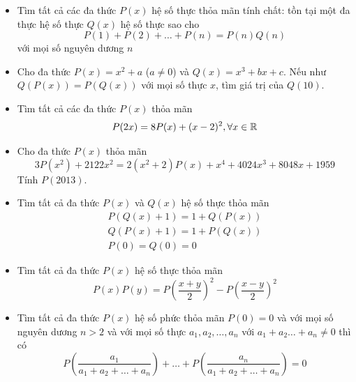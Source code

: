 \documentclass[11pt]{scrartcl}
\begin{document}
\begin{itemize}[label=, leftmargin=0em, itemsep=0.5em]
        \item \begin{btvn}
            Tìm tất cả các đa thức $P(x)$ hệ số thực thỏa mãn tính chất: tồn tại một đa thực hệ số thực $Q(x)$ hệ số thực sao cho
            \[
                P(1) + P(2) + \dots + P(n) = P(n)Q(n)
            \]
            với mọi số nguyên dương $n$
        \end{btvn}

        \item \begin{btvn}
            Cho đa thức $P(x) = x^2 + a$ ($a \neq 0$) và $Q(x) = x^3 + bx + c$. Nếu như $Q(P(x)) = P(Q(x))$ với mọi số thực $x$, tìm giá trị của $Q(10)$.
        \end{btvn}

        \item \begin{btvn}
            Tìm tất cả các đa thức $P(x)$ thỏa mãn
            \[P(2x) = 8P(x) + (x - 2)^2, \forall x \in \mathbb{R}\]
        \end{btvn}

        \item \begin{btvn}
            Cho đa thức $P(x)$ thỏa mãn
            \[
                3P(x^2) + 2122x^2 = 2(x^2 + 2)P(x) + x^4 + 4024x^3 + 8048x + 1959
            \]
            Tính $P(2013)$.
        \end{btvn}

        \item \begin{btvn}
            Tìm tất cả đa thức $P(x)$ và $Q(x)$ hệ số thực thỏa mãn
            $$
            \begin{gathered}
            P(Q(x)+1)=1+Q(P(x)) \\
            Q(P(x)+1)=1+P(Q(x)) \\
            P(0)=Q(0)=0
            \end{gathered}
            $$
        \end{btvn}

        \item \begin{btvn}
            Tìm tất cả đa thức $P(x)$ hệ số thực thỏa mãn
            $$
            P(x) P(y)=P\left(\frac{x+y}{2}\right)^2-P\left(\frac{x-y}{2}\right)^2
            $$
        \end{btvn}

        \item \begin{btvn}
            Tìm tất cả đa thức $P(x)$ hệ số phức thỏa mãn $P(0)=0$ và với mọi số nguyên dương $n>2$ và với mọi số thực $a_1, a_2, \ldots, a_n$ với $a_1+a_2 \ldots+a_n \neq 0$ thì có
                $$
                P\left(\frac{a_1}{a_1+a_2+\ldots+a_n}\right)+\ldots+P\left(\frac{a_n}{a_1+a_2+\ldots+a_n}\right)=0
                $$
        \end{btvn}


\end{itemize}
\end{document}
